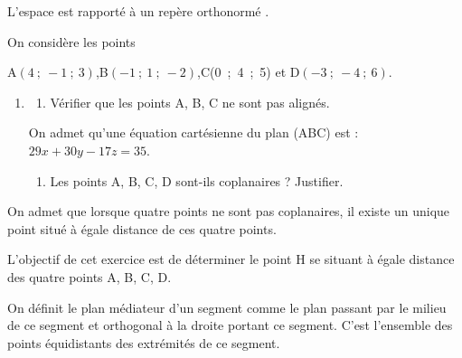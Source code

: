 \medskip

L'espace est rapporté à un repère orthonormé \Oijk.

On considère les points 

\begin{center}A$(4~;~-1~;~3)$,\quad B$(-1~;~1~;~-2)$,\quad C(0~;~4~;~5) et D$(-3~;~-4~;~6)$.\end{center}

\begin{enumerate}
\item
	\begin{enumerate}
		\item Vérifier que les points A, B, C ne sont pas alignés.
	\end{enumerate}

On admet qu’une équation cartésienne du plan (ABC) est : $29x + 30y - 17z = 35$.

	\begin{enumerate}[resume]
		\item Les points A, B, C, D sont-ils coplanaires ? Justifier.
	\end{enumerate}
\end{enumerate}

On admet que lorsque quatre points ne sont pas coplanaires, il existe un unique point situé à égale distance de ces quatre points.

L’objectif de cet exercice est de déterminer le point H se situant à égale distance des quatre points A, B, C, D.

On définit le plan médiateur d’un segment comme le plan passant par le milieu de ce segment et orthogonal à la droite portant ce segment. C’est l’ensemble des points équidistants des extrémités de ce segment.

